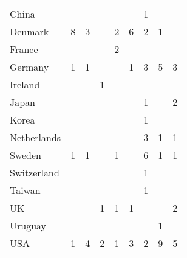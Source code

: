 \begin{table}[ht]
\begin{tabular}{lp{.07\linewidth}p{.07\linewidth}p{.09\linewidth}p{.09\linewidth}p{.07\linewidth}p{.08\linewidth}p{.1\linewidth}p{.07\linewidth}}
  \hspace{2mm}China &  &  &  &  &  & 1 &  &  \\ 
  \hspace{2mm}Denmark & 8 & 3 &  & 2 & 6 & 2 & 1 &  \\ 
  \hspace{2mm}France &  &  &  & 2 &  &  &  &  \\ 
  \hspace{2mm}Germany & 1 & 1 &  &  & 1 & 3 & 5 & 3 \\ 
  \hspace{2mm}Ireland &  &  & 1 &  &  &  &  &  \\ 
  \hspace{2mm}Japan &  &  &  &  &  & 1 &  & 2 \\ 
  \hspace{2mm}Korea &  &  &  &  &  & 1 &  &  \\ 
  \hspace{2mm}Netherlands &  &  &  &  &  & 3 & 1 & 1 \\ 
  \hspace{2mm}Sweden & 1 & 1 &  & 1 &  & 6 & 1 & 1 \\ 
  \hspace{2mm}Switzerland &  &  &  &  &  & 1 &  &  \\ 
  \hspace{2mm}Taiwan &  &  &  &  &  & 1 &  &  \\ 
  \hspace{2mm}UK &  &  & 1 & 1 & 1 &  &  & 2 \\ 
  \hspace{2mm}Uruguay &  &  &  &  &  &  & 1 &  \\ 
  \hspace{2mm}USA & 1 & 4 & 2 & 1 & 3 & 2 & 9 & 5 \\ 
   \hline
\end{tabular}
\endgroup
\end{table}
